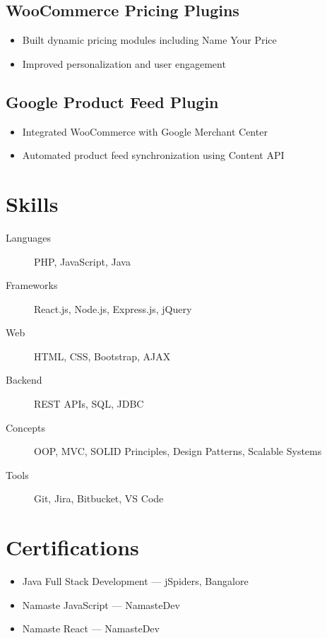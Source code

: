 \documentclass[11pt]{article}
\begin{document}
\subsection{WooCommerce Pricing Plugins}
\begin{itemize}
\item Built dynamic pricing modules including Name Your Price
\item Improved personalization and user engagement
\end{itemize}

\subsection{Google Product Feed Plugin}
\begin{itemize}
\item Integrated WooCommerce with Google Merchant Center
\item Automated product feed synchronization using Content API
\end{itemize}

\section{Skills}
\begin{description}
\item[Languages] PHP, JavaScript, Java
\item[Frameworks] React.js, Node.js, Express.js, jQuery
\item[Web] HTML, CSS, Bootstrap, AJAX
\item[Backend] REST APIs, SQL, JDBC
\item[Concepts] OOP, MVC, SOLID Principles, Design Patterns, Scalable Systems
\item[Tools] Git, Jira, Bitbucket, VS Code
\end{description}

\section{Certifications}
\begin{itemize}
\item Java Full Stack Development — jSpiders, Bangalore
\item Namaste JavaScript — NamasteDev
\item Namaste React — NamasteDev
\end{itemize}
\end{document}
